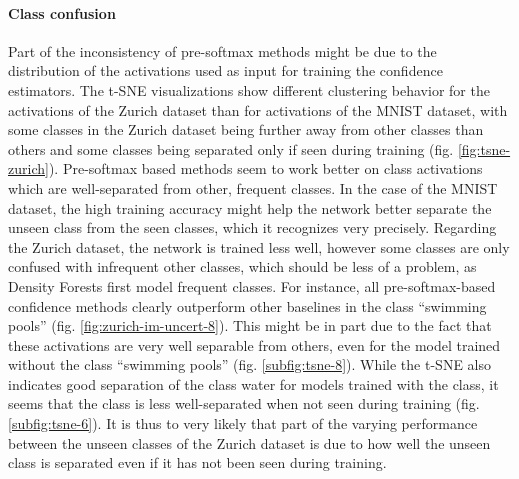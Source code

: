 \documentclass[10pt]{article}
\begin{document}
\paragraph{Class confusion} Part of the inconsistency of pre-softmax methods might be due to the distribution of the activations used as input for training the confidence estimators. The \gls{t-SNE} visualizations show different clustering behavior for the activations of the Zurich dataset than for activations of the \gls{MNIST} dataset, with some classes in the Zurich dataset being further away from other classes than others and some classes being separated only if seen during training (fig. \ref{fig:tsne-zurich}). Pre-softmax based methods seem to work better on class activations which are well-separated from other, frequent classes. In the case of the \gls{MNIST} dataset, the high training accuracy might help the network better separate the unseen class from the seen classes, which it recognizes very precisely. Regarding the Zurich dataset, the network is trained less well, however some classes are only confused with infrequent other classes, which should be less of a problem, as Density Forests first model frequent classes. For instance, all pre-softmax-based confidence methods clearly outperform other baselines in the class ``swimming pools'' (fig. \ref{fig:zurich-im-uncert-8}). This might be in part due to the fact that these activations are very well separable from others, even for the model trained without the class ``swimming pools'' (fig. \ref{subfig:tsne-8}). While the \gls{t-SNE} also indicates good separation of the class water for models trained with the class, it seems that the class is less well-separated when not seen during training (fig. \ref{subfig:tsne-6}). It is thus to very likely that part of the varying performance between the unseen classes of the Zurich dataset is due to how well the unseen class is separated even if it has not been seen during training.

\end{document}
